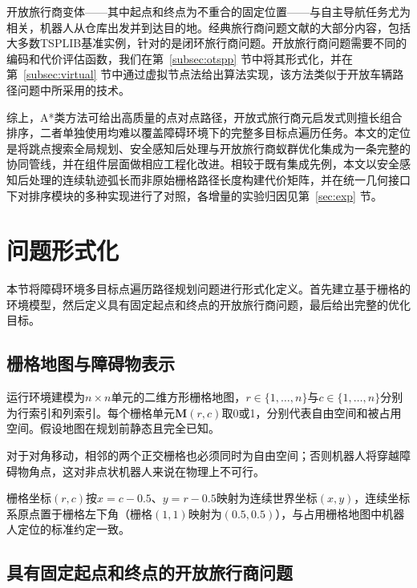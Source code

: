 \documentclass[lettersize,journal]{IEEEtran}
\begin{document}
开放旅行商变体——其中起点和终点为不重合的固定位置——与自主导航任务尤为相关，机器人从仓库出发并到达目的地。经典旅行商问题文献的大部分内容，包括大多数TSPLIB基准实例，针对的是闭环旅行商问题。开放旅行商问题需要不同的编码和代价评估函数，我们在第~\textcolor{blue}{\ref{subsec:otspp}} 节中将其形式化，并在第~\textcolor{blue}{\ref{subsec:virtual}} 节中通过虚拟节点法给出算法实现，该方法类似于开放车辆路径问题中所采用的技术\textcolor{blue}{\cite{ref31,ref32}}。

综上，A*类方法可给出高质量的点对点路径，开放式旅行商元启发式则擅长组合排序，二者单独使用均难以覆盖障碍环境下的完整多目标点遍历任务。本文的定位是将跳点搜索全局规划、安全感知后处理与开放旅行商蚁群优化集成为一条完整的协同管线，并在组件层面做相应工程化改进。相较于既有集成先例\textcolor{blue}{\cite{ref1,ref2}}，本文以安全感知后处理的连续轨迹弧长而非原始栅格路径长度构建代价矩阵，并在统一几何接口下对排序模块的多种实现进行了对照，各增量的实验归因见第~\textcolor{blue}{\ref{sec:exp}} 节。

\section{问题形式化}

\label{sec:form}

本节将障碍环境多目标点遍历路径规划问题进行形式化定义。首先建立基于栅格的环境模型，然后定义具有固定起点和终点的开放旅行商问题，最后给出完整的优化目标。

\subsection{栅格地图与障碍物表示}

运行环境建模为$n \times n$单元的二维方形栅格地图，$r \in \{1, \dots, n\}$与$c \in \{1, \dots, n\}$分别为行索引和列索引。每个栅格单元$\mathbf{M}(r, c)$取0或1，分别代表自由空间和被占用空间。假设地图在规划前静态且完全已知。

对于对角移动，相邻的两个正交栅格也必须同时为自由空间；否则机器人将穿越障碍物角点，这对非点状机器人来说在物理上不可行。

栅格坐标$(r, c)$按$x = c - 0.5$、$y = r - 0.5$映射为连续世界坐标$(x, y)$，连续坐标系原点置于栅格左下角（栅格$(1,1)$映射为$(0.5, 0.5)$），与占用栅格地图中机器人定位的标准约定一致。

\subsection{具有固定起点和终点的开放旅行商问题}
\end{document}

